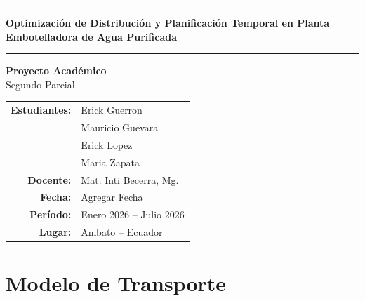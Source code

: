 \documentclass{article}
\begin{document}
	
	\thispagestyle{fancy}
	
	\begin{center}
		
		\vspace{3cm}
		\rule{\linewidth}{1pt}
		\vspace{0.4cm}
		
		{\Large\textbf{Optimización de Distribución y Planificación
				Temporal en Planta Embotelladora de Agua
				Purificada
		}}
		
		\vspace{0.4cm}
		\rule{\linewidth}{1pt}
		
		\vspace{3cm}
		{\large\textbf{Proyecto Académico}} \\[0.3cm]
		{\normalsize Segundo Parcial}
		
		\vspace{1.5cm}
		\begin{tabular}{rl}
			\textbf{Estudiantes:} & Erick Guerron  \\
			& Mauricio Guevara  \\
			& Erick Lopez \\
			& Maria Zapata \\[0.4cm]
			\textbf{Docente:}     & Mat. Inti Becerra, Mg. \\[0.2cm]
			\textbf{Fecha:}       & Agregar Fecha \\[0.2cm]
			\textbf{Período:}     & Enero 2026 -- Julio 2026 \\[0.2cm]
			\textbf{Lugar:}       & Ambato -- Ecuador \\
		\end{tabular}
		
	\end{center}
	
	\newpage
	
	\tableofcontents
	\newpage
	
	
	
	\section{Modelo de Transporte}
	
\end{document}
